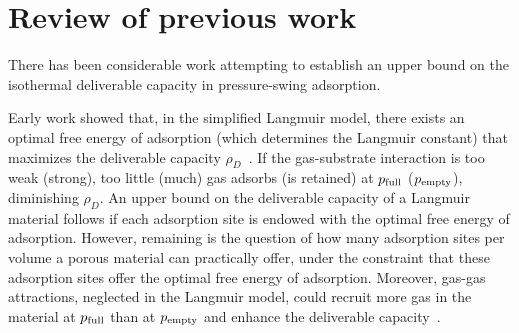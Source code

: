 

\section{Review of previous work}
There has been considerable work attempting to establish an upper bound on the isothermal deliverable capacity in pressure-swing adsorption.

Early work showed that, in the simplified Langmuir model, there exists an optimal free energy of adsorption (which determines the Langmuir constant) that maximizes the deliverable capacity $\rho_D$~\cite{matranga1992storage,bhatia2006optimum,simon2014optimizing}.
If the gas-substrate interaction is too weak (strong), too little (much) gas adsorbs (is retained) at $p_{\text{full}}$ ($p_{\text{empty}}$), diminishing $\rho_D$. An upper bound on the deliverable capacity of a Langmuir material follows if each adsorption site is endowed with the optimal free energy of adsorption. However, remaining is the question of how many adsorption sites per volume a porous material can practically offer, under the constraint that these adsorption sites offer the optimal free energy of adsorption. Moreover, gas-gas attractions, neglected in the Langmuir model, could recruit more gas in the material at $p_{\text{full}}$ than at $p_{\text{empty}}$ and enhance the deliverable capacity~\cite{simon2014optimizing}.

